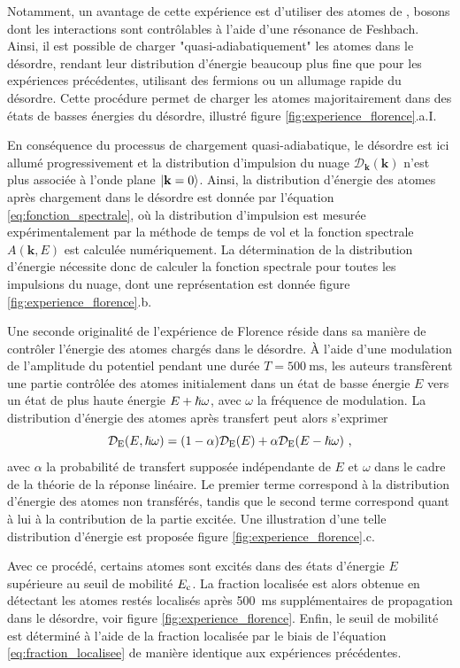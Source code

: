 Notamment, un avantage de cette expérience est d'utiliser des atomes de , bosons dont les interactions sont contrôlables à l'aide d'une résonance de Feshbach. Ainsi, il est possible de charger "quasi-adiabatiquement" les atomes dans le désordre, rendant leur distribution d'énergie beaucoup plus fine que pour les expériences précédentes, utilisant des fermions ou un allumage rapide du désordre. Cette procédure permet de charger les atomes majoritairement dans des états de basses énergies du désordre, illustré figure \ref{fig:experience_florence}.a.I.

En conséquence du processus de chargement quasi-adiabatique, le désordre est ici allumé progressivement et la distribution d'impulsion du nuage $\mathcal{D}_{\mathbf{k}}(\mathbf{k})$ n'est plus associée à l'onde plane $\left| \mathbf{k}=0 \right\rangle$. Ainsi, la distribution d'énergie des atomes après chargement dans le désordre est donnée par l'équation \ref{eq:fonction_spectrale}, où la distribution d'impulsion est mesurée expérimentalement par la méthode de temps de vol et la fonction spectrale $A(\mathbf{k},E)$ est calculée numériquement. La détermination de la distribution d'énergie nécessite donc de calculer la fonction spectrale pour toutes les impulsions du nuage, dont une représentation est donnée figure \ref{fig:experience_florence}.b.

Une seconde originalité de l'expérience de Florence réside dans sa manière de contrôler l'énergie des atomes chargés dans le désordre. À l'aide d'une modulation de l'amplitude du potentiel pendant une durée $T=\SI{500}{\milli\second}$, les auteurs transfèrent une partie contrôlée des atomes initialement dans un état de basse énergie $E$ vers un état de plus haute énergie $E+\hslash\omega$, avec $\omega$ la fréquence de modulation. La distribution d'énergie des atomes après transfert peut alors s'exprimer
\begin{equation}
\mathcal{D}_{\mathrm{E}}(E,\hslash\omega)=(1-\alpha)\mathcal{D}_{\mathrm{E}}(E)+\alpha \mathcal{D}_{\mathrm{E}}(E-\hslash\omega) \text{ ,}
\end{equation}
avec $\alpha$ la probabilité de transfert supposée indépendante de $E$ et $\omega$ dans le cadre de la théorie de la réponse linéaire. Le premier terme correspond à la distribution d'énergie des atomes non transférés, tandis que le second terme correspond quant à lui à la contribution de la partie excitée. Une illustration d'une telle distribution d'énergie est proposée figure \ref{fig:experience_florence}.c.

Avec ce procédé, certains atomes sont excités dans des états d'énergie $E$ supérieure au seuil de mobilité $E_{\mathrm{c}}$. La fraction localisée est alors obtenue en détectant les atomes restés localisés après \SI{500}{\milli\second} supplémentaires de propagation dans le désordre, voir figure \ref{fig:experience_florence}. Enfin, le seuil de mobilité est déterminé à l'aide de la fraction localisée par le biais de l'équation \ref{eq:fraction_localisee} de manière identique aux expériences précédentes.

